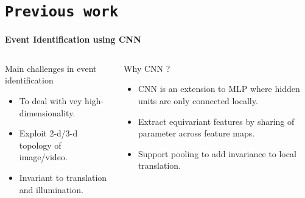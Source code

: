 \section{\texttt{Previous work}}
\begin{frame}{\textbf{Event Identification using CNN}}
\begin{columns}
	\begin{column}{0.48\textwidth}
		\begin{varblock}[\textwidth]{Main challenges in event identification}
			\begin{itemize}							
				\item To deal with vey high-dimensionality.
				\item Exploit 2-d/3-d topology of image/video.
				\item Invariant to translation and illumination.			
			\end{itemize}
		\end{varblock}
	\end{column}
	\begin{column}{0.48\textwidth}
		\begin{varblock}[\textwidth]{Why CNN ?}			
			\begin{itemize}							
				\item CNN is an extension to MLP where hidden units are only connected locally.
				\item Extract equivariant features by sharing of parameter across feature maps.
				\item Support pooling to add invariance to local translation.			
			\end{itemize}
		\end{varblock}
	\end{column}
\end{columns}	
\end{frame}
